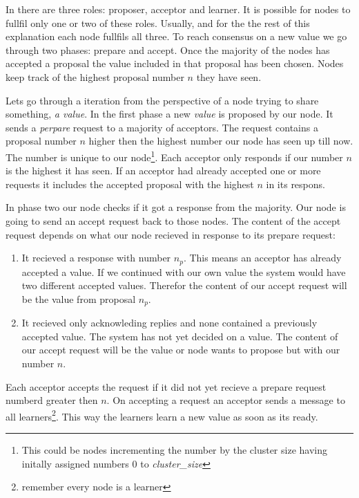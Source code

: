 In \paxos{} there are three roles: proposer, acceptor and learner. It is possible for nodes to fullfil only one or two of these roles. Usually, and for the the rest of this explanation each node fullfils all three. To reach consensus on a new value we go through two phases: prepare and accept. Once the majority of the nodes has accepted a proposal the value included in that proposal has been chosen. Nodes keep track of the highest proposal number $n$ they have seen. 

Lets go through a \paxos{} iteration from the perspective of a node trying to share something, \textit{a value}. In the first phase a new \textit{value} is proposed by our node. It sends a \textit{perpare} request to a majority of acceptors. The request contains a proposal number $n$ higher then the highest number our node has seen up till now. The number is unique to our node\footnote{This could be nodes incrementing the number by the cluster size having initally assigned numbers $0$ to \textit{cluster\_size}}. Each acceptor only responds if our number $n$ is the highest it has seen. If an acceptor had already accepted one or more requests it includes the accepted proposal with the highest $n$ in its respons.

In phase two our node checks if it got a response from the majority. Our node is going to send an accept request back to those nodes. The content of the accept request depends on what our node recieved in response to its prepare request:
%
\begin{enumerate}
	\item It recieved a response with number $n_p$. This means an acceptor has already accepted a value. If we continued with our own value the system would have two different accepted values. Therefor the content of our accept request will be the value from proposal $n_p$.
	\item It recieved only acknowleding replies and none contained a previously accepted value. The system has not yet decided on a value. The content of our accept request will be the value or node wants to propose but with our number $n$.
\end{enumerate}
%
Each acceptor accepts the request if it did not yet recieve a prepare request numberd greater then $n$. On accepting a request an acceptor sends a message to all learners\footnote{remember every node is a learner}. This way the learners learn a new value as soon as its ready.



